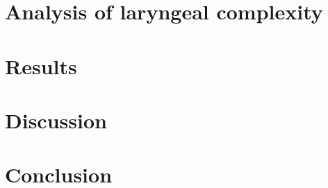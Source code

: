 \section{Analysis of laryngeal complexity}\label{sec:analysis_of_lc}


\section{Results}\label{sec:results_of_lc}


\section{Discussion}\label{sec:discussion_of_lc}

\citet{humbertConsonantTypesVowel1978} 


\section{Conclusion}\label{sec:conclusion_of_lc}
